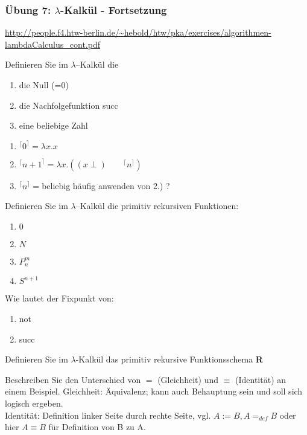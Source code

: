 \begin{card}
	\frametitle{Übung 7: $\lambda$-Kalkül - Fortsetzung}
	\url{http://people.f4.htw-berlin.de/~hebold/htw/pka/exercises/algorithmen-lambdaCalculus_cont.pdf}
\end{card}

\begin{card}
	Definieren Sie im $\lambda$–Kalkül die
	\begin{enumerate}
	\item die Null (=0)
	\item die Nachfolgefunktion succ
	\item eine beliebige Zahl
	\end{enumerate}
	\hr
	\begin{enumerate}
	\item $^\lceil 0 ^\rceil = \lambda x.x$
	\item $^\lceil n+1 ^\rceil = \lambda x.((x \perp )\qquad ^\lceil n ^\rceil)$
	\item $^\lceil n ^\rceil = $beliebig häufig anwenden von 2.) ?
	\end{enumerate}
\end{card}

\begin{card}
	Definieren Sie im $\lambda$–Kalkül die primitiv rekursiven Funktionen: 
	\begin{enumerate}
	\item $0$
	\item $N$
	\item $P^m_n$
	\item $S^{n+1}$
	\end{enumerate}
\end{card}

\begin{card}
	Wie lautet der Fixpunkt von: 
	\begin{enumerate}
	\item not
	\item succ
	\end{enumerate}
\end{card}

\begin{card}
	Definieren Sie im $\lambda$-Kalkül das primitiv rekursive Funktionsschema	\textbf{R}
\end{card}

\begin{card}
	Beschreiben Sie den Unterschied von $=$ (Gleichheit) und $\equiv$ (Identität) an einem Beispiel.
	\hr
	Gleichheit: Äquivalenz; kann auch Behauptung sein und soll sich logisch ergeben.\\
	Identität: Definition linker Seite durch rechte Seite, vgl. $A := B, A=_{def} B$ oder hier $A \equiv B $ für Definition von B zu A.
\end{card}

